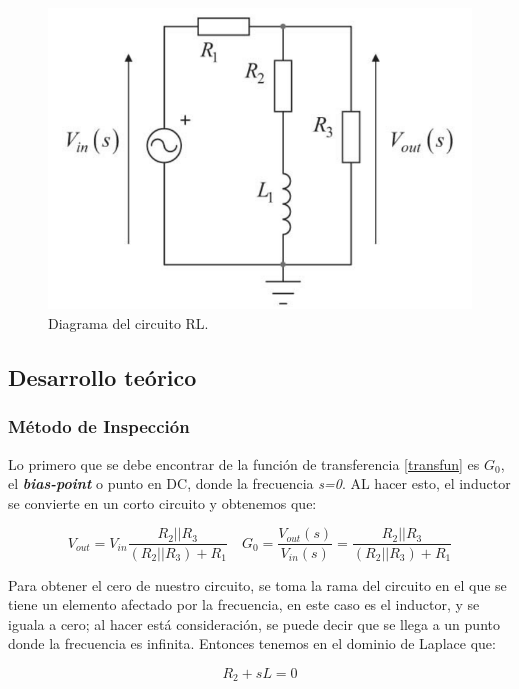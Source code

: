 \documentclass{article}
\begin{document}
	\begin{figure}[H]
		\centering
		\includegraphics[scale=0.5]{circ}
		\caption{Diagrama del circuito RL.}
		\label{fig:circ}
	\end{figure}
	
	
	\subsection{Desarrollo teórico}
	\subsubsection{Método de Inspección}
	
	Lo primero que se debe encontrar de la función de transferencia \eqref{transfun} es $ G_0 $, el \textit{\textbf{bias-point}} o punto en DC, donde la frecuencia \textit{s=0}. AL hacer esto, el inductor se convierte en un corto circuito y obtenemos que:
	
	\begin{equation}
	V_{out}=V_{in}\frac{R_2||R_3}{(R_2||R_3)+R_1}\quad G_0=\frac{V_{out}(s)}{V_{in}(s)}=\frac{R_2||R_3}{(R_2||R_3)+R_1}
	\label{bias}
	\end{equation}
	
	Para obtener el cero de nuestro circuito, se toma la rama del circuito en el que se tiene un elemento afectado por la frecuencia, en este caso es el inductor, y se iguala a cero; al hacer está consideración, se puede decir que se llega a un punto donde la frecuencia es infinita. Entonces tenemos en el dominio de Laplace que:
	
	\begin{equation}
	R_2+sL=0
	\label{cerocirc}
	\end{equation}
	
\end{document}
